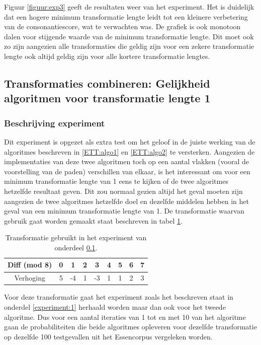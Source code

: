 Figuur \ref{figuur:exp3} geeft de resultaten weer van het experiment. Het is duidelijk dat een hogere minimum transformatie lengte leidt tot een kleinere verbetering van de consonantiescore, wat te verwachten was. De grafiek is ook monotoon dalen voor stijgende waarde van de minimum transformatie lengte. Dit moet ook zo zijn aangezien alle transformaties die geldig zijn voor een zekere transformatie lengte ook altijd geldig zijn voor alle kortere transformatie lengtes.

\subsection{Transformaties combineren: Gelijkheid algoritmen voor transformatie lengte 1}
\label{experiment:4}
\subsubsection{Beschrijving experiment}
Dit experiment is opgezet als extra test om het geloof in de juiste werking van de algoritmes beschreven in \ref{ETT:algo1} en \ref{ETT:algo2} te versterken. Aangezien de implementaties van deze twee algoritmen toch op een aantal vlakken (vooral de voorstelling van de paden) verschillen van elkaar, is het interessant om voor een minimum transformatie lengte van 1 eens te kijken of de twee algoritmes hetzelfde resultaat geven. Dit zou normaal gezien altijd het geval moeten zijn aangezien de twee algoritmes hetzelfde doel en dezelfde middelen hebben in het geval van een minimum transformatie lengte van 1. De transformatie waarvan gebruik gaat worden gemaakt staat beschreven in tabel \ref{tabel:exp4}.

\begin{table}
  \centering
  \begin{tabular}{c | c c c c c c c c }
    Diff (mod 8) & 0 & 1 & 2 & 3 & 4 & 5 & 6 & 7 \\
    \hline
    \hline
    Verhoging & 5 & -4 & 1 & -3 & 1 & 1 & 2 & 3 \\
  \end{tabular}
  \caption{Transformatie gebruikt in het experiment van onderdeel \ref{experiment:4}.}
  \label{tabel:exp4}
\end{table}

Voor deze transformatie gaat het experiment zoals het beschreven staat in onderdel \ref{experiment:1} herhaald worden maar dan ook voor het tweede algoritme. Dus voor een aantal iteraties van 1 tot en met 10 van het algoritme gaan de probabiliteiten die beide algoritmes opleveren voor dezelfde transformatie op dezelfde 100 testgevallen uit het Essencorpus vergeleken worden.

